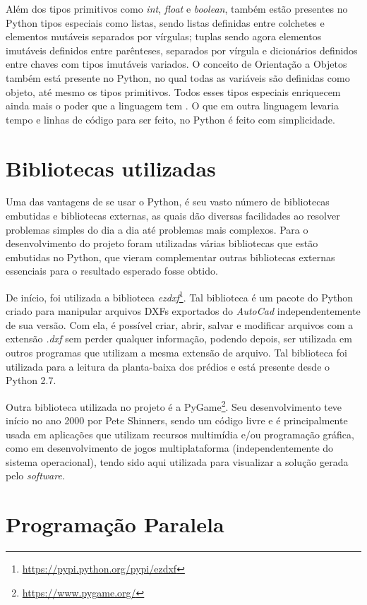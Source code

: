 \documentclass[
	12pt,				%
	twoside,			%
	a4paper,			%
	english,			%
	french,				%
	spanish,			%
	brazil				%
	]{abntex2}
\begin{document}
Além dos tipos primitivos como \emph{int}, \emph{float} e
\emph{boolean}, também estão presentes no Python tipos especiais como
listas, sendo listas definidas entre colchetes e elementos mutáveis
separados por vírgulas; tuplas sendo agora elementos imutáveis definidos
entre parênteses, separados por vírgula e dicionários definidos entre
chaves com tipos imutáveis variados. O conceito de Orientação a Objetos
também está presente no Python, no qual todas as variáveis são definidas
como objeto, até mesmo os tipos primitivos. Todos esses tipos especiais
enriquecem ainda mais o poder que a linguagem tem \cite{GUIDO}. O que em
outra linguagem levaria tempo e linhas de código para ser feito, no
Python é feito com simplicidade.

\section{Bibliotecas utilizadas}\label{bibliotecas-utilizadas}

Uma das vantagens de se usar o Python, é seu vasto número de bibliotecas
embutidas e bibliotecas externas, as quais dão diversas facilidades ao
resolver problemas simples do dia a dia até problemas mais complexos.
Para o desenvolvimento do projeto foram utilizadas várias bibliotecas
que estão embutidas no Python, que vieram complementar outras
bibliotecas externas essenciais para o resultado esperado fosse obtido.

De início, foi utilizada a biblioteca \emph{ezdxf}\footnote{\url{https://pypi.python.org/pypi/ezdxf}}.
Tal biblioteca é um pacote do Python criado para manipular arquivos DXFs
exportados do \emph{AutoCad} independentemente de sua versão. Com ela, é
possível criar, abrir, salvar e modificar arquivos com a extensão
\emph{.dxf} sem perder qualquer informação, podendo depois, ser
utilizada em outros programas que utilizam a mesma extensão de arquivo.
Tal biblioteca foi utilizada para a leitura da planta-baixa dos prédios
e está presente desde o Python 2.7.

Outra biblioteca utilizada no projeto é a PyGame\footnote{\url{https://www.pygame.org/}}.
Seu desenvolvimento teve início no ano 2000 por Pete Shinners, sendo um
código livre e é principalmente usada em aplicações que utilizam
recursos multimídia e/ou programação gráfica, como em desenvolvimento de
jogos multiplataforma (independentemente do sistema operacional), tendo
sido aqui utilizada para visualizar a solução gerada pelo
\emph{software}.

\section{Programação Paralela}\label{programauxe7uxe3o-paralela}
\end{document}
